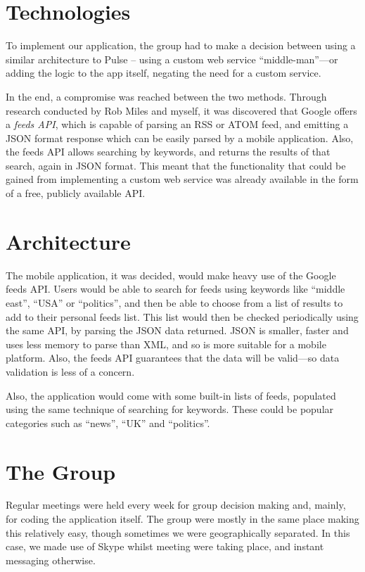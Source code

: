 \documentclass[a4paper,11pt]{article}
\begin{document}
    \section{Technologies}

    To implement our application, the group had to make a decision between
    using a similar architecture to Pulse – using a custom web service
    ``middle-man''---or adding the logic to the app itself, negating the need
    for a custom service.

    In the end, a compromise was reached between the two methods. Through
    research conducted by Rob Miles and myself, it was discovered that Google
    offers a \emph{feeds API}, which is capable of parsing an RSS or ATOM feed,
    and emitting a JSON format response which can be easily parsed by a mobile
    application. Also, the feeds API allows searching by keywords, and returns
    the results of that search, again in JSON format. This meant that the
    functionality that could be gained from implementing a custom web service
    was already available in the form of a free, publicly available API.

    \section{Architecture}

    The mobile application, it was decided, would make heavy use of the Google
    feeds API. Users would be able to search for feeds using keywords like
    ``middle east'', ``USA'' or ``politics'', and then be able to choose from
    a list of results to add to their personal feeds list. This list would then
    be checked periodically using the same API, by parsing the JSON data
    returned. JSON is smaller, faster and uses less memory to parse than XML,
    and so is more suitable for a mobile platform. Also, the feeds API
    guarantees that the data will be valid---so data validation is less of
    a concern.

    Also, the application would come with some built-in lists of feeds,
    populated using the same technique of searching for keywords. These could
    be popular categories such as ``news'', ``UK'' and ``politics''.

    \section{The Group}

    Regular meetings were held every week for group decision making and,
    mainly, for coding the application itself. The group were mostly in the
    same place making this relatively easy, though sometimes we were
    geographically separated. In this case, we made use of Skype whilst meeting
    were taking place, and instant messaging otherwise.
\end{document}
